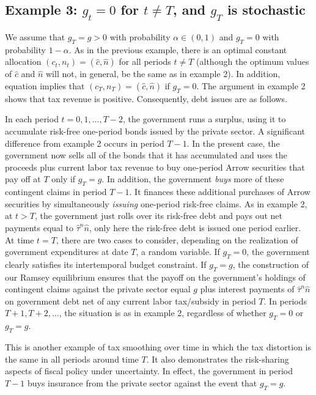 \subsection{Example 3: $g_t=0$ for $t\not= T$, and $g_T$ is stochastic}
\label{sec:LucasStokey_ex3}%
We assume that $g_T=g>0$ with probability $\alpha \in (0,1)$ and $g_T=0$ with
probability $1-\alpha$.  As in the previous example, there is an
optimal constant allocation $(c_t,n_t)=(\hat c, \hat n)$ for all
periods $t\not= T$ (although the optimum values of $\hat c$ and
$\hat n$ will not, in general, be the same as in example 2). In addition,
equation  implies that $(c_T,n_T)=(\hat c, \hat n)$ if $g_T=0$.
The argument in example 2 shows that tax revenue is positive. Consequently, debt issues are as follows.

In each period $t=0,1, \ldots ,T-2$, the government
runs a surplus, using it to accumulate risk-free one-period bonds issued by the
private sector. A significant difference from example 2 occurs in
period $T-1$.  In the present case, the government now sells all of the bonds that it has accumulated and uses
the proceeds plus current labor tax revenue to buy one-period Arrow securities
that  pay off at $T$ only if $g_T=g$. In addition, the government {\it buys\/} more of these contingent
claims in period $T-1$. It finances these additional purchases of Arrow securities by simultaneously {\it issuing\/} one-period risk-free claims.
As in example 2,
at $t > T$, the government just rolls over its risk-free debt and pays out net
payments
equal to $\hat \tau^n \hat n$, only  here the risk-free debt is issued one period earlier.
At time $t=T$, there are two cases to consider, depending on the realization of  government expenditures at date $T$, a random variable.
If $g_T=0$, the government clearly satisfies
its intertemporal budget constraint. If $g_T=g$, the construction
of our Ramsey equilibrium ensures that the payoff on the government's
holdings of contingent claims against the private sector  equal
$g$ plus interest payments of $\hat \tau^n \hat n$ on government debt net
of any current labor tax/subsidy in period $T$. In periods $T+1,T+2,\ldots$,
the situation is as in example 2, regardless of whether $g_T=0$ or
$g_T=g$.

This is another example of tax smoothing over time in which the  tax distortion is the same in all periods around time $T$. It also
demonstrates the risk-sharing aspects of fiscal policy under uncertainty.
In effect, the government in period $T-1$ buys insurance from the private
sector against the event that $g_T=g$.


